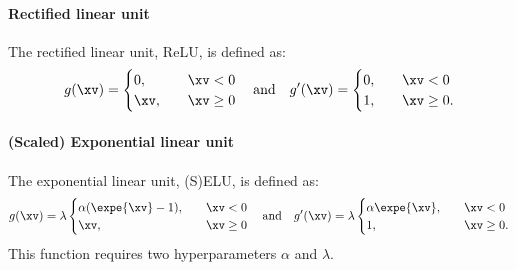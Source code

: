         \paragraph{Rectified linear unit}
            The rectified linear unit, ReLU, is defined as:
            \begin{equation}
                g(\xv) = 
                \begin{cases}
                    0, \quad & \xv < 0 \\
                    \xv, \quad & \xv \geq 0
                \end{cases}
                \quad \mathrm{and} \quad
                g'(\xv) = 
                \begin{cases}
                    0, \quad & \xv < 0 \\
                    1, \quad & \xv \geq 0.
                \end{cases}
            \end{equation}

        \paragraph{(Scaled) Exponential linear unit}
            The exponential linear unit, (S)ELU, is defined as:
            \begin{equation}
                g(\xv) = \lambda
                \begin{cases}
                    \alpha(\expe{\xv}-1), \quad & \xv < 0 \\
                    \xv, \quad & \xv \geq 0
                \end{cases}
                \quad \mathrm{and} \quad
                g'(\xv) = \lambda
                \begin{cases}
                    \alpha\expe{\xv}, \quad & \xv < 0 \\
                    1, \quad & \xv \geq 0.
                \end{cases}
            \end{equation}
            This function requires two hyperparameters $\alpha$ and $\lambda$.

